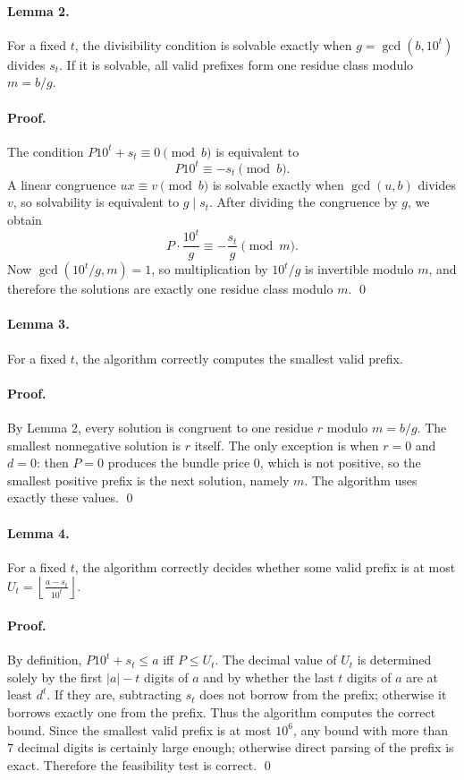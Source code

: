 \documentclass[11pt]{article}
\begin{document}
\paragraph{Lemma 2.}
For a fixed $t$, the divisibility condition is solvable exactly when $g=\gcd(b,10^t)$ divides $s_t$. If it is
solvable, all valid prefixes form one residue class modulo $m=b/g$.

\paragraph{Proof.}
The condition $P10^t + s_t \equiv 0 \pmod b$ is equivalent to
\[
    P10^t \equiv -s_t \pmod b.
\]
A linear congruence $ux \equiv v \pmod b$ is solvable exactly when $\gcd(u,b)$ divides $v$, so solvability
is equivalent to $g \mid s_t$.
After dividing the congruence by $g$, we obtain
\[
    P \cdot \frac{10^t}{g} \equiv -\frac{s_t}{g} \pmod m.
\]
Now $\gcd(10^t/g,m)=1$, so multiplication by $10^t/g$ is invertible modulo $m$, and therefore the
solutions are exactly one residue class modulo $m$. \qed

\paragraph{Lemma 3.}
For a fixed $t$, the algorithm correctly computes the smallest valid prefix.

\paragraph{Proof.}
By Lemma 2, every solution is congruent to one residue $r$ modulo $m=b/g$. The smallest nonnegative
solution is $r$ itself. The only exception is when $r=0$ and $d=0$: then $P=0$ produces the bundle
price $0$, which is not positive, so the smallest positive prefix is the next solution, namely $m$.
The algorithm uses exactly these values. \qed

\paragraph{Lemma 4.}
For a fixed $t$, the algorithm correctly decides whether some valid prefix is at most
$U_t = \left\lfloor \frac{a-s_t}{10^t} \right\rfloor$.

\paragraph{Proof.}
By definition, $P10^t+s_t \le a$ iff $P \le U_t$.
The decimal value of $U_t$ is determined solely by the first $|a|-t$ digits of $a$ and by whether the last
$t$ digits of $a$ are at least $d^t$. If they are, subtracting $s_t$ does not borrow from the prefix; otherwise
it borrows exactly one from the prefix. Thus the algorithm computes the correct bound.
Since the smallest valid prefix is at most $10^6$, any bound with more than $7$ decimal digits is certainly
large enough; otherwise direct parsing of the prefix is exact. Therefore the feasibility test is correct. \qed
\end{document}
